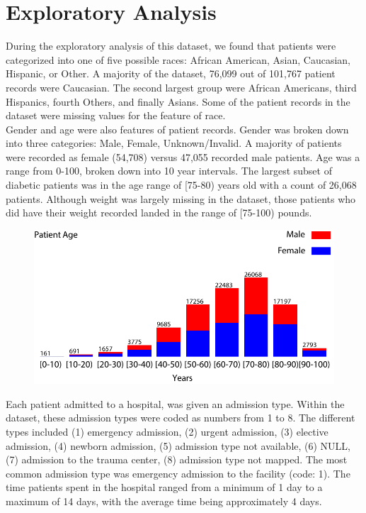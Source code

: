 \documentclass{neu_handout}
\begin{document}
\section*{Exploratory Analysis}
During the exploratory analysis of this dataset, we found that patients were categorized into one of five possible races: African American, Asian, Caucasian, Hispanic, or Other. A majority of the dataset, 76,099 out of 101,767 patient records were Caucasian. The second largest group were African Americans, third Hispanics, fourth Others, and finally Asians. Some of the patient records in the dataset were missing values for the feature of race. \\

Gender and age were also features of patient records. Gender was broken down into three categories: Male, Female, Unknown/Invalid. A majority of patients were recorded as female (54,708) versus 47,055 recorded male patients. Age was a range from 0-100, broken down into 10 year intervals. The largest subset of diabetic patients was in the age range of [75-80) years old with a count of 26,068 patients. Although weight was largely missing in the dataset, those patients who did have their weight recorded landed in the range of [75-100) pounds.  \\

\begin{figure}[h]
\centering
{
\includegraphics[width=0.47\linewidth]{age.pdf}
}

\end{figure} 

Each patient admitted to a hospital, was given an admission type. Within the dataset, these admission types were coded as numbers from 1 to 8. The different types included (1) emergency admission, (2) urgent admission, (3) elective admission, (4) newborn admission, (5) admission type not available, (6) NULL, (7) admission to the trauma center, (8) admission type not mapped. The most common admission type was emergency admission to the facility (code: 1). The time patients spent in the hospital ranged from a minimum of 1 day to a maximum of 14 days, with the average time being approximately 4 days. \\
\end{document}
